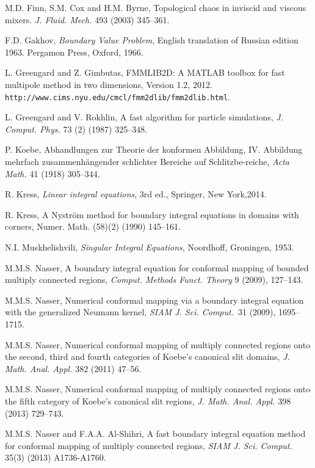 \documentclass[11pt,a4paper]{article}
\begin{document}
\begin{thebibliography}{00}
M.D. Finn, S.M. Cox and H.M. Byrne, Topological chaos in inviscid and viscous mixers. \emph{J. Fluid. Mech.} 493 (2003) 345--361.

F.D. Gakhov, \emph{Boundary Value Problem}, English translation of Russian edition 1963. Pergamon Press, Oxford, 1966.
 
L. Greengard and Z. Gimbutas, FMMLIB2D: A MATLAB toolbox for fast multipole method in two dimensions, Version 1.2, 2012. \verb|http://www.cims.nyu.edu/cmcl/fmm2dlib/fmm2dlib.html|.

L. Greengard and V. Rokhlin, A fast algorithm for particle simulations, \emph{J. Comput. Phys.} 73 (2) (1987) 325--348.

P. Koebe, Abhandlungen zur Theorie der konformen Abbildung, IV. Abbildung mehrfach zusammenh\"angender schlichter Bereiche auf Schlitzbe-reiche, \emph{Acta Math.} 41 (1918) 305--344.

R. Kress, \emph{Linear integral equations}, 3rd ed., Springer, New York,2014.

R. Kress, A {N}ystr\"om method for boundary integral equations in domains with corners, Numer. Math. (58)(2) (1990) 145--161.

N.I. Muskhelishvili, \emph{Singular Integral Equations}, Noordhoff, Groningen, 1953.

M.M.S. Nasser, A boundary integral equation for conformal mapping of bounded multiply connected regions, \emph{Comput. Methods Funct. Theory} 9 (2009), 127--143.

M.M.S. Nasser, Numerical conformal mapping via a boundary integral equation with the generalized Neumann kernel, \emph{SIAM J. Sci. Comput.}~31 (2009), 1695--1715.

M.M.S. Nasser, Numerical conformal mapping of multiply connected regions onto the second, third and fourth categories of Koebe's canonical slit domains, \emph{J. Math. Anal. Appl.} 382 (2011) 47--56.

M.M.S. Nasser, Numerical conformal mapping of multiply connected regions onto the fifth category of Koebe's canonical slit regions, \emph{J. Math. Anal. Appl.} 398 (2013) 729--743.

M.M.S. Nasser and F.A.A. Al-Shihri, A fast boundary integral equation method for conformal mapping of multiply connected regions, \emph{SIAM J. Sci. Comput.} 35(3) (2013) A1736-A1760.


\end{thebibliography}
\end{document}
